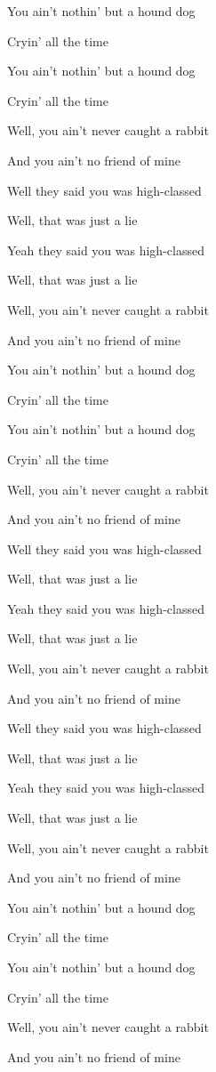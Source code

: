 

\zs
You ain't nothin' but a hound dog

Cryin' all the time

You ain't nothin' but a hound dog

Cryin' all the time

Well, you ain't never caught a rabbit

And you ain't no friend of mine
\ks

\zs
Well they said you was high-classed
                    
Well, that was just a lie

Yeah they said you was high-classed

Well, that was just a lie

Well, you ain't never caught a rabbit

And you ain't no friend of mine
\ks

\zs
You ain't nothin' but a hound dog

Cryin' all the time

You ain't nothin' but a hound dog

Cryin' all the time

Well, you ain't never caught a rabbit

And you ain't no friend of mine
\ks

\zs
Well they said you was high-classed
                    
Well, that was just a lie

Yeah they said you was high-classed

Well, that was just a lie

Well, you ain't never caught a rabbit

And you ain't no friend of mine
\ks

\zs
Well they said you was high-classed
                    
Well, that was just a lie

Yeah they said you was high-classed

Well, that was just a lie

Well, you ain't never caught a rabbit

And you ain't no friend of mine
\ks

\zs
You ain't nothin' but a hound dog

Cryin' all the time

You ain't nothin' but a hound dog

Cryin' all the time

Well, you ain't never caught a rabbit

And you ain't no friend of mine 
\ks

\kp
